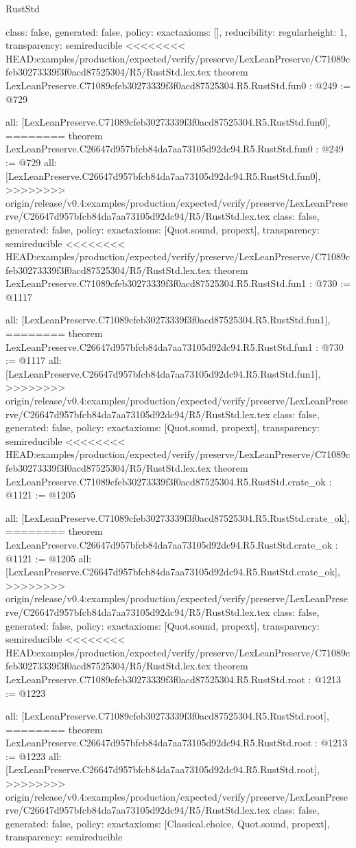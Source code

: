 \begin{lexlean}{RustStd}
\begin{coremodule}
{\begin{coremodule}
{{{  class: false,
  generated: false,
  policy: exact{axioms: []},
  reducibility: regular{height: 1},
  transparency: semireducible
}
<<<<<<<< HEAD:examples/production/expected/verify/preserve/LexLeanPreserve/C71089cfeb30273339f3f0acd87525304/R5/RustStd.lex.tex
theorem LexLeanPreserve.C71089cfeb30273339f3f0acd87525304.R5.RustStd.fun0 : @249 := @729 {
  all: [LexLeanPreserve.C71089cfeb30273339f3f0acd87525304.R5.RustStd.fun0],
========
theorem LexLeanPreserve.C26647d957bfcb84da7aa73105d92dc94.R5.RustStd.fun0 : @249 := @729 {
  all: [LexLeanPreserve.C26647d957bfcb84da7aa73105d92dc94.R5.RustStd.fun0],
>>>>>>>> origin/release/v0.4:examples/production/expected/verify/preserve/LexLeanPreserve/C26647d957bfcb84da7aa73105d92dc94/R5/RustStd.lex.tex
  class: false,
  generated: false,
  policy: exact{axioms: [Quot.sound, propext]},
  transparency: semireducible
}
<<<<<<<< HEAD:examples/production/expected/verify/preserve/LexLeanPreserve/C71089cfeb30273339f3f0acd87525304/R5/RustStd.lex.tex
theorem LexLeanPreserve.C71089cfeb30273339f3f0acd87525304.R5.RustStd.fun1 : @730 := @1117 {
  all: [LexLeanPreserve.C71089cfeb30273339f3f0acd87525304.R5.RustStd.fun1],
========
theorem LexLeanPreserve.C26647d957bfcb84da7aa73105d92dc94.R5.RustStd.fun1 : @730 := @1117 {
  all: [LexLeanPreserve.C26647d957bfcb84da7aa73105d92dc94.R5.RustStd.fun1],
>>>>>>>> origin/release/v0.4:examples/production/expected/verify/preserve/LexLeanPreserve/C26647d957bfcb84da7aa73105d92dc94/R5/RustStd.lex.tex
  class: false,
  generated: false,
  policy: exact{axioms: [Quot.sound, propext]},
  transparency: semireducible
}
<<<<<<<< HEAD:examples/production/expected/verify/preserve/LexLeanPreserve/C71089cfeb30273339f3f0acd87525304/R5/RustStd.lex.tex
theorem LexLeanPreserve.C71089cfeb30273339f3f0acd87525304.R5.RustStd.crate_ok : @1121 := @1205 {
  all: [LexLeanPreserve.C71089cfeb30273339f3f0acd87525304.R5.RustStd.crate_ok],
========
theorem LexLeanPreserve.C26647d957bfcb84da7aa73105d92dc94.R5.RustStd.crate_ok : @1121 := @1205 {
  all: [LexLeanPreserve.C26647d957bfcb84da7aa73105d92dc94.R5.RustStd.crate_ok],
>>>>>>>> origin/release/v0.4:examples/production/expected/verify/preserve/LexLeanPreserve/C26647d957bfcb84da7aa73105d92dc94/R5/RustStd.lex.tex
  class: false,
  generated: false,
  policy: exact{axioms: [Quot.sound, propext]},
  transparency: semireducible
}
<<<<<<<< HEAD:examples/production/expected/verify/preserve/LexLeanPreserve/C71089cfeb30273339f3f0acd87525304/R5/RustStd.lex.tex
theorem LexLeanPreserve.C71089cfeb30273339f3f0acd87525304.R5.RustStd.root : @1213 := @1223 {
  all: [LexLeanPreserve.C71089cfeb30273339f3f0acd87525304.R5.RustStd.root],
========
theorem LexLeanPreserve.C26647d957bfcb84da7aa73105d92dc94.R5.RustStd.root : @1213 := @1223 {
  all: [LexLeanPreserve.C26647d957bfcb84da7aa73105d92dc94.R5.RustStd.root],
>>>>>>>> origin/release/v0.4:examples/production/expected/verify/preserve/LexLeanPreserve/C26647d957bfcb84da7aa73105d92dc94/R5/RustStd.lex.tex
  class: false,
  generated: false,
  policy: exact{axioms: [Classical.choice, Quot.sound, propext]},
  transparency: semireducible
}

}}}}}}
\end{coremodule}}
\end{coremodule}
\end{lexlean}
